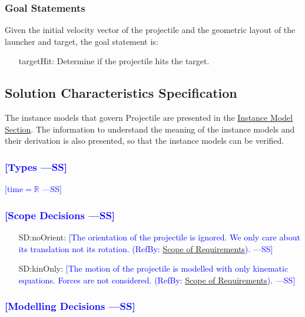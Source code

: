 \documentclass[12pt]{article}
\newcommand{\authornote}[3]{\textcolor{#1}{[#3 ---#2]}}
\newcommand{\authornote}[3]{}
\newcommand{\wss}[1]{\authornote{blue}{SS}{#1}}
\begin{document}
\subsubsection{Goal Statements}
\label{Sec:GoalStmt}
Given the initial velocity vector of the projectile and the geometric layout of the launcher and target, the goal statement is:

\begin{itemize} \item[targetHit:\phantomsection\label{targetHit}]{Determine if
the projectile hits the target.} \end{itemize} \subsection{Solution
Characteristics Specification} \label{Sec:SolCharSpec} The instance models that
govern Projectile are presented in the \hyperref[Sec:IMs]{Instance Model
Section}. The information to understand the meaning of the instance models and
their derivation is also presented, so that the instance models can be verified.

\subsubsection{\wss{Types}}

\wss{$\text{time} = \mathbb{R}$} 

\subsubsection{\wss{Scope Decisions}}
\label{Sec:ScopeDec} 

\begin{itemize}
\item[SD:noOrient:\phantomsection\label{SD:noOrient}]{\wss{The orientation of the projectile is ignored. We only care about its translation not its rotation.  (RefBy: \hyperref[Sec:ReqsScope]{Scope of Requirements}).}}
\item[SD:kinOnly:\phantomsection\label{SD:kinOnly}]{\wss{The motion of the
projectile is modelled with only kinematic equations. Forces are not
considered. (RefBy: \hyperref[Sec:ReqsScope]{Scope of Requirements}).}} 
\end{itemize}

\subsubsection{\wss{Modelling Decisions}}
\label{Sec:ModelDec}
\end{document}
